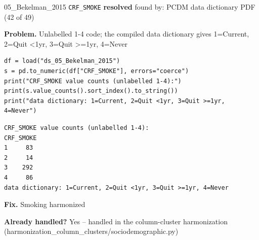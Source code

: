 \documentclass[9pt, t, handout]{beamer}
\newcommand{\ans}[1]{\textcolor{structure.fg}{#1}}
\begin{document}
\begin{frame}[fragile]{05\_Bekelman\_2015 \quad \texttt{CRF\_SMOKE}}
  {\scriptsize\textcolor{green!45!black}{\textbf{resolved}} \quad
   found by: PCDM data dictionary PDF \quad (42 of 49)}
  \vspace{3pt}

  {\footnotesize \textbf{Problem.} Unlabelled 1-4 code; the compiled data dictionary gives 1=Current, 2=Quit <1yr, 3=Quit >=1yr, 4=Never}
  \vspace{4pt}

  \begin{Verbatim}[fontsize=\tiny, frame=single, framesep=2pt, label=\tiny reproduce]
df = load("ds_05_Bekelman_2015")
s = pd.to_numeric(df["CRF_SMOKE"], errors="coerce")
print("CRF_SMOKE value counts (unlabelled 1-4):")
print(s.value_counts().sort_index().to_string())
print("data dictionary: 1=Current, 2=Quit <1yr, 3=Quit >=1yr, 4=Never")
  \end{Verbatim}
  \begin{Verbatim}[fontsize=\tiny, frame=single, framesep=2pt, label=\tiny output]
CRF_SMOKE value counts (unlabelled 1-4):
CRF_SMOKE
1     83
2     14
3    292
4     86
data dictionary: 1=Current, 2=Quit <1yr, 3=Quit >=1yr, 4=Never
  \end{Verbatim}
  \vspace{2pt}

  {\footnotesize \textbf{Fix.} Smoking harmonized}
  \vspace{2pt}

  {\footnotesize \textbf{Already handled?} \ans{Yes} -- handled in the column-cluster harmonization
   (harmonization\_column\_clusters/sociodemographic.py)}
\end{frame}
\end{document}
